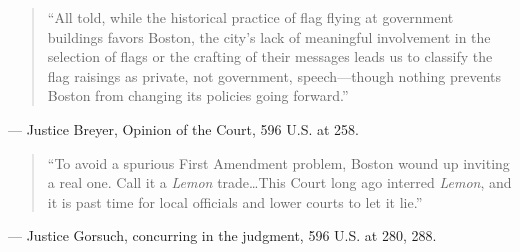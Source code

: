 \documentclass[12pt]{article}
\begin{document}
\begin{quote}
``All told, while the historical practice of flag flying at government buildings favors Boston, the city's lack of meaningful involvement in the selection of flags or the crafting of their messages leads us to classify the flag raisings as private, not government, speech---though nothing prevents Boston from changing its policies going forward.''
\end{quote}
\noindent --- Justice Breyer, Opinion of the Court, 596 U.S. at 258.

\begin{quote}
``To avoid a spurious First Amendment problem, Boston wound up inviting a real one. Call it a \textit{Lemon} trade\ldots This Court long ago interred \textit{Lemon}, and it is past time for local officials and lower courts to let it lie.''
\end{quote}
\noindent --- Justice Gorsuch, concurring in the judgment, 596 U.S. at 280, 288.
\end{document}
